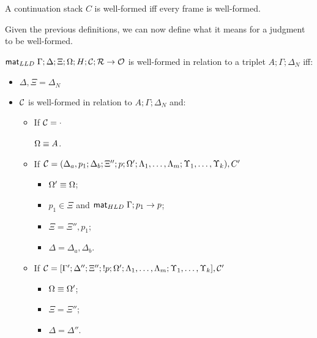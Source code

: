 \begin{definition}
A continuation stack $C$ is well-formed iff every frame is well-formed.
\end{definition}

Given the previous definitions, we can now define what it means for a judgment
to be well-formed.

\begin{definition}

$\mathsf{mat}_{LLD} \; \Gamma; \Delta; \Xi; \Omega; H; \mathcal{C}; \mathcal{R} \rightarrow \mathcal{O}$
is well-formed in relation to a triplet $A; \Gamma; \Delta_{N}$ iff:

\begin{itemize}[leftmargin=*]
   \item $\Delta, \Xi = \Delta_{N}$
   \item $\mathcal{C}$ is well-formed in relation to $A; \Gamma; \Delta_{N}$ and:
   \begin{itemize}[leftmargin=\secondm]
      \item If $\mathcal{C} = \cdot$
   
      $\Omega \equiv A$.
   
      \item If $\mathcal{C} = (\Delta_a, p_1; \Delta_b; \Xi''; p; \Omega'; \Lambda_1,
            \dotsc, \Lambda_m; \Upsilon_1, \dotsc, \Upsilon_k), C'$
   
      \begin{itemize}[leftmargin=\thirdm]
         \item $\Omega' \equiv \Omega$;
         \item $p_1 \in \Xi$ and $\mathsf{mat}_{HLD} \; \Gamma; p_1 \rightarrow p$;
         \item $\Xi = \Xi'', p_1$;
         \item $\Delta = \Delta_a, \Delta_b$.
      \end{itemize}
      \item If $\mathcal{C} = [\Gamma'; \Delta''; \Xi''; {!} p; \Omega'; \Lambda_1,
      \dotsc, \Lambda_m; \Upsilon_1, \dotsc, \Upsilon_k], \mathcal{C'}$
      \begin{itemize}[leftmargin=\thirdm]
         \item $\Omega \equiv \Omega'$;
         \item $\Xi = \Xi''$;
         \item $\Delta = \Delta''$.
      \end{itemize}
   \end{itemize}
\end{itemize}

\end{definition}

